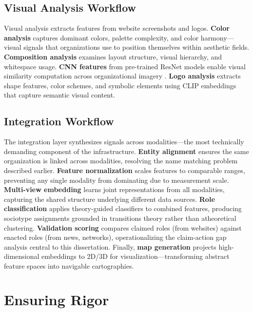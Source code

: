 \documentclass[../main.tex]{subfiles}
\begin{document}
\subsection{Visual Analysis Workflow}

Visual analysis extracts features from website screenshots and logos. \textbf{Color analysis} captures dominant colors, palette complexity, and color harmony---visual signals that organizations use to position themselves within aesthetic fields. \textbf{Composition analysis} examines layout structure, visual hierarchy, and whitespace usage. \textbf{CNN features} from pre-trained ResNet models \cite{he2016resnet} enable visual similarity computation across organizational imagery \cite{krizhevsky2012imagenet}. \textbf{Logo analysis} extracts shape features, color schemes, and symbolic elements using CLIP embeddings \cite{radford2021clip} that capture semantic visual content.

\subsection{Integration Workflow}

The integration layer synthesizes signals across modalities---the most technically demanding component of the infrastructure. \textbf{Entity alignment} ensures the same organization is linked across modalities, resolving the name matching problem described earlier. \textbf{Feature normalization} scales features to comparable ranges, preventing any single modality from dominating due to measurement scale. \textbf{Multi-view embedding} learns joint representations from all modalities, capturing the shared structure underlying different data sources. \textbf{Role classification} applies theory-guided classifiers to combined features, producing sociotype assignments grounded in transitions theory rather than atheoretical clustering. \textbf{Validation scoring} compares claimed roles (from websites) against enacted roles (from news, networks), operationalizing the claim-action gap analysis central to this dissertation. Finally, \textbf{map generation} projects high-dimensional embeddings to 2D/3D for visualization---transforming abstract feature spaces into navigable cartographies.


\section{Ensuring Rigor}
\end{document}
